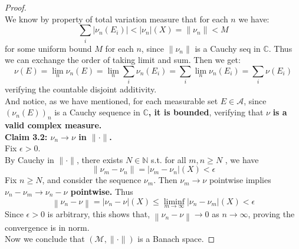 \documentclass[lang=cn,11pt]{elegantbook}
\begin{document}
\begin{proof}
\[\]We know by property of total variation measure that for each $n$ we have: \[
\sum_i |\nu_n(E_i)| <  |\nu_n| (X) = \| \nu_n\| <M 
\]for some uniform bound $M$ for each $n$, since $\|\nu_n\|$ is a Cauchy seq in $\mathbb{C}$. Thus we can exchange the order of taking limit and sum. Then we get: \[
  \nu(E) = \lim_n \nu_n(E) = \lim_n \sum_i  \nu_n(E_i) = \sum_i \lim_n \nu_n(E_i) = \sum_i \nu(E_i)
  \]
verifying the countable disjoint additivity. \\
And notice, as we have mentioned, for each measurable set $E\in \mathcal{A}$, since $(\nu_n(E))_n$ is a Cauchy sequence in $\mathbb{C}$\textbf{, it is bounded}, verifying that $\nu$ \textbf{is a valid complex measure.}\\
\textbf{Claim 3.2: $\nu_n \to \nu$ in $\|\cdot\|$.}\\
Fix $\epsilon > 0$.\\
By Cauchy in $\| \cdot \|$, there exists $N \in \mathbb{N}$ s.t. for all $m,n \geq N$
, we have \[
 \|\nu_m - \nu_n \| = |\nu_m - \nu_n| (X) < \epsilon
\]Fix $n \geq N$, and consider the sequence $\nu_m$. Then $\nu_m \rightarrow \nu$ pointwise implies \textbf{$\nu_n-\nu_m \rightarrow \nu_n-\nu$ pointwise. } Thus
$$
\left\|\nu_n-\nu\right\| =  | \nu_n - \nu| (X)  \leq \liminf _{m \rightarrow \infty} |\nu_n - \nu_m| (X)<\epsilon
$$
Since $\epsilon > 0$ is arbitrary, this shows that, $\left\|\nu_n-\nu\right\| \rightarrow 0$ as $n\to \infty$, proving the convergence is in norm.\\
Now we conclude that $(\mathcal{M}, \| \cdot \|)$ is a Banach space.
\end{proof}
\end{document}
